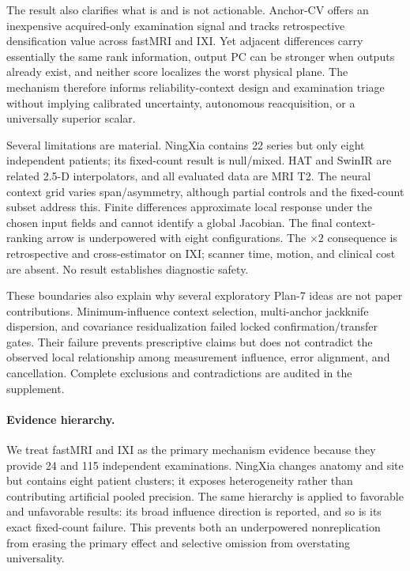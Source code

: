 \documentclass[10pt,twocolumn,letterpaper]{article}
\begin{document}
The result also clarifies what is and is not actionable. Anchor-CV offers an inexpensive acquired-only examination signal and tracks retrospective densification value across fastMRI and IXI. Yet adjacent differences carry essentially the same rank information, output PC can be stronger when outputs already exist, and neither score localizes the worst physical plane. The mechanism therefore informs reliability-context design and examination triage without implying calibrated uncertainty, autonomous reacquisition, or a universally superior scalar.

Several limitations are material. NingXia contains 22 series but only eight independent patients; its fixed-count result is null/mixed. HAT and SwinIR are related 2.5-D interpolators, and all evaluated data are MRI T2. The neural context grid varies span/asymmetry, although partial controls and the fixed-count subset address this. Finite differences approximate local response under the chosen input fields and cannot identify a global Jacobian. The final context-ranking arrow is underpowered with eight configurations. The $\times2$ consequence is retrospective and cross-estimator on IXI; scanner time, motion, and clinical cost are absent. No result establishes diagnostic safety.

These boundaries also explain why several exploratory Plan-7 ideas are not paper contributions. Minimum-influence context selection, multi-anchor jackknife dispersion, and covariance residualization failed locked confirmation/transfer gates. Their failure prevents prescriptive claims but does not contradict the observed local relationship among measurement influence, error alignment, and cancellation. Complete exclusions and contradictions are audited in the supplement.

\paragraph{Evidence hierarchy.}
We treat fastMRI and IXI as the primary mechanism evidence because they provide 24 and 115 independent examinations. NingXia changes anatomy and site but contains eight patient clusters; it exposes heterogeneity rather than contributing artificial pooled precision. The same hierarchy is applied to favorable and unfavorable results: its broad influence direction is reported, and so is its exact fixed-count failure. This prevents both an underpowered nonreplication from erasing the primary effect and selective omission from overstating universality.
\end{document}
